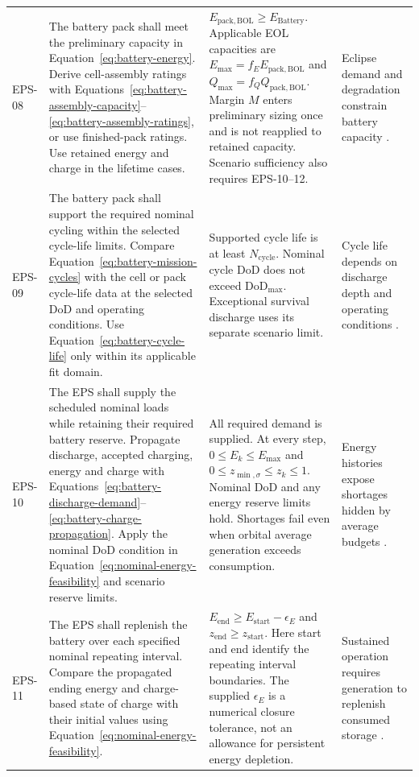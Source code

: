 \begin{longtable}{@{}P{0.09\ReportTableBodyWidth}P{0.37\ReportTableBodyWidth}P{0.29\ReportTableBodyWidth}P{0.25\ReportTableBodyWidth}@{}}
EPS-08\label{epsreq:EPS-08} & The battery pack shall meet the preliminary capacity in Equation~\eqref{eq:battery-energy}. Derive cell-assembly ratings with Equations~\eqref{eq:battery-assembly-capacity}--\eqref{eq:battery-assembly-ratings}, or use finished-pack ratings. Use retained energy and charge in the lifetime cases. & \(E_{\mathrm{pack,BOL}}\geq E_{\mathrm{Battery}}\). Applicable EOL capacities are \(E_{\max}=f_EE_{\mathrm{pack,BOL}}\) and \(Q_{\max}=f_QQ_{\mathrm{pack,BOL}}\). Margin \(M\) enters preliminary sizing once and is not reapplied to retained capacity. Scenario sufficiency also requires EPS-10--12. & Eclipse demand and degradation constrain battery capacity \citep[Secs.~3 and~6.2.2]{handpicked-0003}. \\
EPS-09\label{epsreq:EPS-09} & The battery pack shall support the required nominal cycling within the selected cycle-life limits. Compare Equation~\eqref{eq:battery-mission-cycles} with the cell or pack cycle-life data at the selected DoD and operating conditions. Use Equation~\eqref{eq:battery-cycle-life} only within its applicable fit domain. & Supported cycle life is at least \(N_{\mathrm{cycle}}\). Nominal cycle DoD does not exceed \(\mathrm{DoD}_{\max}\). Exceptional survival discharge uses its separate scenario limit. & Cycle life depends on discharge depth and operating conditions \citep[Sec.~3]{handpicked-0003}. \\
EPS-10\label{epsreq:EPS-10} & The EPS shall supply the scheduled nominal loads while retaining their required battery reserve. Propagate discharge, accepted charging, energy and charge with Equations~\eqref{eq:battery-discharge-demand}--\eqref{eq:battery-charge-propagation}. Apply the nominal DoD condition in Equation~\eqref{eq:nominal-energy-feasibility} and scenario reserve limits. & All required demand is supplied. At every step, \(0\leq E_k\leq E_{\max}\) and \(0\leq z_{\min,\sigma}\leq z_k\leq1\). Nominal DoD and any energy reserve limits hold. Shortages fail even when orbital average generation exceeds consumption. & Energy histories expose shortages hidden by average budgets \citep[Secs.~V--VI]{review-1231}. \\
EPS-11\label{epsreq:EPS-11} & The EPS shall replenish the battery over each specified nominal repeating interval. Compare the propagated ending energy and charge-based state of charge with their initial values using Equation~\eqref{eq:nominal-energy-feasibility}. & \(E_{\mathrm{end}}\geq E_{\mathrm{start}}-\epsilon_E\) and \(z_{\mathrm{end}}\geq z_{\mathrm{start}}\). Here start and end identify the repeating interval boundaries. The supplied \(\epsilon_E\) is a numerical closure tolerance, not an allowance for persistent energy depletion. & Sustained operation requires generation to replenish consumed storage \citep[Sec.~3]{review-0289}. \\

\end{longtable}
